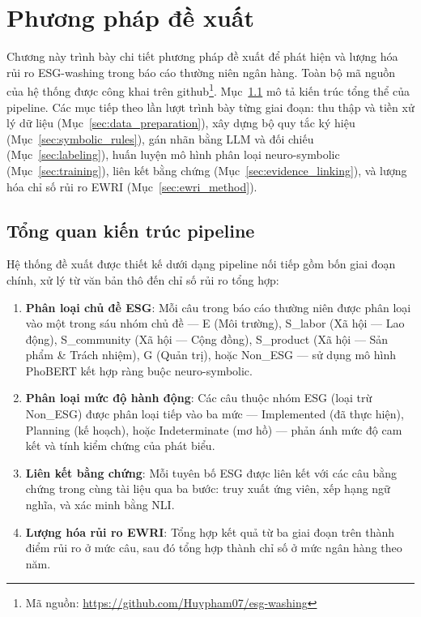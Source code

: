 \chapter{Phương pháp đề xuất}
\label{ch:method}
\setcounter{footnote}{0}

Chương này trình bày chi tiết phương pháp đề xuất để phát hiện và lượng hóa rủi ro ESG-washing trong báo cáo thường niên ngân hàng. Toàn bộ mã nguồn của hệ thống được công khai trên github\footnote{Mã nguồn: \url{https://github.com/Huypham07/esg-washing}}. Mục~\ref{sec:pipeline_overview} mô tả kiến trúc tổng thể của pipeline. Các mục tiếp theo lần lượt trình bày từng giai đoạn: thu thập và tiền xử lý dữ liệu (Mục~\ref{sec:data_preparation}), xây dựng bộ quy tắc ký hiệu (Mục~\ref{sec:symbolic_rules}), gán nhãn bằng LLM và đối chiếu (Mục~\ref{sec:labeling}), huấn luyện mô hình phân loại neuro-symbolic (Mục~\ref{sec:training}), liên kết bằng chứng (Mục~\ref{sec:evidence_linking}), và lượng hóa chỉ số rủi ro EWRI (Mục~\ref{sec:ewri_method}).

\section{Tổng quan kiến trúc pipeline}
\label{sec:pipeline_overview}

Hệ thống đề xuất được thiết kế dưới dạng pipeline nối tiếp gồm bốn giai đoạn chính, xử lý từ văn bản thô đến chỉ số rủi ro tổng hợp:

\begin{enumerate}
    \item \textbf{Phân loại chủ đề ESG}: Mỗi câu trong báo cáo thường niên được phân loại vào một trong sáu nhóm chủ đề --- E (Môi trường), S\_labor (Xã hội --- Lao động), S\_community (Xã hội --- Cộng đồng), S\_product (Xã hội --- Sản phẩm \& Trách nhiệm), G (Quản trị), hoặc Non\_ESG --- sử dụng mô hình PhoBERT kết hợp ràng buộc neuro-symbolic.

    \item \textbf{Phân loại mức độ hành động}: Các câu thuộc nhóm ESG (loại trừ Non\_ESG) được phân loại tiếp vào ba mức --- Implemented (đã thực hiện), Planning (kế hoạch), hoặc Indeterminate (mơ hồ) --- phản ánh mức độ cam kết và tính kiểm chứng của phát biểu.

    \item \textbf{Liên kết bằng chứng}: Mỗi tuyên bố ESG được liên kết với các câu bằng chứng trong cùng tài liệu qua ba bước: truy xuất ứng viên, xếp hạng ngữ nghĩa, và xác minh bằng NLI.

    \item \textbf{Lượng hóa rủi ro EWRI}: Tổng hợp kết quả từ ba giai đoạn trên thành điểm rủi ro ở mức câu, sau đó tổng hợp thành chỉ số ở mức ngân hàng theo năm.
\end{enumerate}

